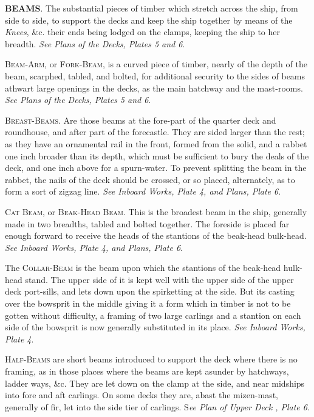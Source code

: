 \textbf{BEAMS}. The substantial pieces of timber which stretch across the ship, from side to side, to support the decks and keep the ship together by means of the \textit{Knees}, \&c. their ends being lodged on the clamps, keeping the ship to her breadth. \textit{See Plans of the Decks, Plates 5 and 6}. 

\textsc{Beam-Arm}, or \textsc{Fork-Beam}, is a curved piece of timber, nearly of the depth of the beam, scarphed, tabled, and bolted, for additional security to the sides of beams athwart large openings in the decks, as the main hatchway and the mast-rooms. \textit{See Plans of the Decks, Plates 5 and 6}. 

\textsc{Breast-Beams}. Are those beams at the fore-part of the quarter deck and roundhouse, and after part of the forecastle. They are sided larger than the rest; as they have an ornamental rail in the front, formed from the solid, and a rabbet one inch broader than its depth, which must be sufficient to bury the deals of the deck, and one inch above for a spurn-water. To prevent splitting the beam in the rabbet, the nails of the deck should be crossed, or so placed, alternately, as to form a sort of zigzag line. \textit{See Inboard Works, Plate 4, and Plans, Plate 6}. 

\textsc{Cat Beam}, or \textsc{Beak-Head Beam}. This is the broadest beam in the ship, generally made in two breadths, tabled and bolted together. The foreside is placed far enough forward to receive the heads of the stantions of the beak-head bulk-head. \textit{See Inboard Works, Plate 4, and Plans, Plate 6}. 

The \textsc{Collar-Beam} is the beam upon which the stantions of the beak-head hulk-head stand. The upper side of it is kept well with the upper side of the upper deck port-sills, and lets down upon the spirketting at the side. But its casting over the bowsprit in the middle giving it a form which in timber is not to be gotten without difficulty, a framing of two large carlings and a stantion on each side of the bowsprit is now generally substituted in its place. \textit{See Inboard Works, Plate 4}. 

\textsc{Half-Beams} are short beams introduced to support the deck where there is no framing, as in those places where the beams are kept asunder by hatchways, ladder ways, \&c. They are let down on the clamp at the side, and near midships into fore and aft carlings. On some decks they are, abast the mizen-mast, generally of fir, let into the side tier of carlings. S\textit{ee Plan of Upper Deck , Plate 6}. 


